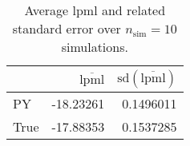 \begin{table}[H]

\caption{Average lpml and related standard error over $n_{\text{sim}} = 10$ simulations.}
\centering
\begin{tabular}[t]{lrr}
\toprule
  & $\overbar{\text{lpml}}$ & $\text{sd}(\overbar{\text{lpml}})$\\
\midrule
PY & -18.23261 & 0.1496011\\
True & -17.88353 & 0.1537285\\
\bottomrule
\end{tabular}
\end{table}